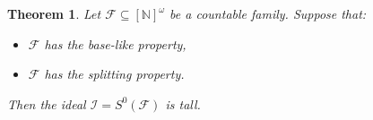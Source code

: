 \documentclass{amsart}
\newtheorem{thm}{Theorem}[section]
\theoremstyle{definition}
\theoremstyle{definition}
\newcommand{\N}{{\mathbb N}}
\newcommand{\I}{\mathcal I}
\newcommand{\InfSubs}{[\N]^{\omega}}
\newcommand{\MB}{S^0}  %
\begin{document}
\begin{thm} \label{thmtall}
Let $\mathcal{F}\subseteq \InfSubs$ be a countable family. Suppose that: 
\begin{itemize}
	\item[$(i)$] $\mathcal{F}$ has the base-like property,
	\item[$(ii)$] $\mathcal{F}$ has the splitting property.
\end{itemize}
Then the ideal $\I=\MB(\mathcal{F})$ is tall.
\end{thm}
\end{document}
